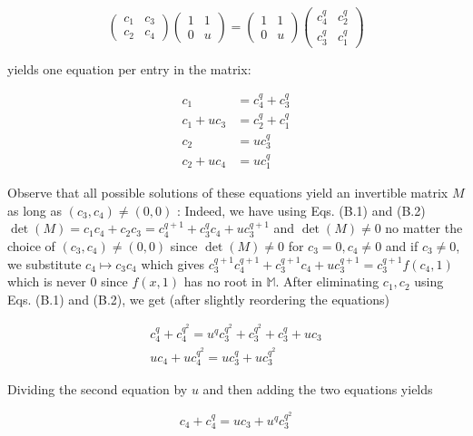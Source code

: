 \documentclass[10pt]{article}
\begin{document}
$$
\left(\begin{array}{ll}
c_{1} & c_{3} \\
c_{2} & c_{4}
\end{array}\right)\left(\begin{array}{ll}
1 & 1 \\
0 & u
\end{array}\right)=\left(\begin{array}{ll}
1 & 1 \\
0 & u
\end{array}\right)\left(\begin{array}{ll}
c_{4}^{q} & c_{2}^{q} \\
c_{3}^{q} & c_{1}^{q}
\end{array}\right)
$$

yields one equation per entry in the matrix:


\begin{align*}
c_{1} & =c_{4}^{q}+c_{3}^{q}  \tag{B.1}\\
c_{1}+u c_{3} & =c_{2}^{q}+c_{1}^{q} \\
c_{2} & =u c_{3}^{q}  \tag{B.2}\\
c_{2}+u c_{4} & =u c_{1}^{q}
\end{align*}


Observe that all possible solutions of these equations yield an invertible matrix $M$ as long as $\left(c_{3}, c_{4}\right) \neq(0,0)$ : Indeed, we have using Eqs. (B.1) and (B.2) $\operatorname{det}(M)=c_{1} c_{4}+c_{2} c_{3}=c_{4}^{q+1}+ c_{3}^{q} c_{4}+u c_{3}^{q+1}$ and $\operatorname{det}(M) \neq 0$ no matter the choice of $\left(c_{3}, c_{4}\right) \neq(0,0)$ since $\operatorname{det}(M) \neq 0$ for $c_{3}=0, c_{4} \neq 0$ and if $c_{3} \neq 0$, we substitute $c_{4} \mapsto c_{3} c_{4}$ which gives $c_{3}^{q+1} c_{4}^{q+1}+c_{3}^{q+1} c_{4}+u c_{3}^{q+1}= c_{3}^{q+1} f\left(c_{4}, 1\right)$ which is never 0 since $f(x, 1)$ has no root in $\mathbb{M}$. After eliminating $c_{1}, c_{2}$ using Eqs. (B.1) and (B.2), we get (after slightly reordering the equations)

\[
\begin{array}{r}
c_{4}^{q}+c_{4}^{q^{2}}=u^{q} c_{3}^{q^{2}}+c_{3}^{q^{2}}+c_{3}^{q}+u c_{3} \\
u c_{4}+u c_{4}^{q^{2}}=u c_{3}^{q}+u c_{3}^{q^{2}} \tag{B.4}
\end{array}
\]

Dividing the second equation by $u$ and then adding the two equations yields

$$
c_{4}+c_{4}^{q}=u c_{3}+u^{q} c_{3}^{q^{2}}
$$
\end{document}

